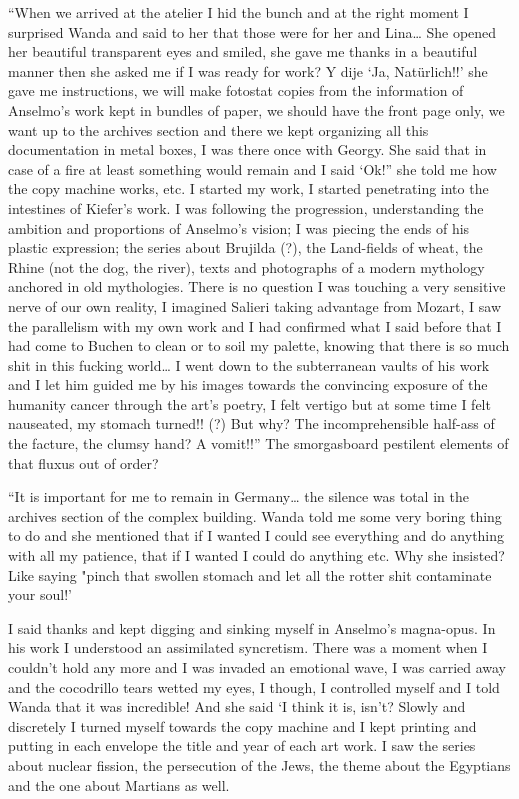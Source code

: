 \documentclass[smalldemyvopaper,11pt,twoside,onecolumn,openright,extrafontsizes]{memoir}
\begin{document}
“When we arrived at the atelier I hid the bunch and at the right moment I surprised Wanda and said to her that those were for her and Lina… She opened her beautiful transparent eyes and smiled, she gave me thanks in a beautiful manner then she asked me if I was ready for work? Y dije ‘Ja, Natürlich!!’ she gave me instructions, we will make fotostat copies from the information of Anselmo’s work kept in bundles of paper, we should have the front page only, we want up to the archives section and there we kept organizing all this documentation in metal boxes, I was there once with Georgy. She said that in case of a fire at least something would remain and I said ‘Ok!” she told me how the copy machine works, etc. I started my work, I started penetrating into the intestines of Kiefer’s work. I was following the progression, understanding the ambition and proportions of Anselmo’s vision; I was piecing the ends of his plastic expression; the series about Brujilda (?), the Land-fields of wheat, the Rhine (not the dog, the river), texts and photographs of a modern mythology anchored in old mythologies. There is no question I was touching a very sensitive nerve of our own reality, I imagined Salieri taking advantage from Mozart, I saw the parallelism with my own work and I had confirmed what I said before that I had come to Buchen to clean or to soil my palette, knowing that there is so much shit in this fucking world… I went down to the subterranean vaults of his work and I let him guided me by his images towards the convincing exposure of the humanity cancer through the art’s poetry, I felt vertigo but at some time I felt nauseated, my stomach turned!! (?) But why? The incomprehensible half-ass of the facture, the clumsy hand? A vomit!!” The smorgasboard pestilent elements of that fluxus out of order? 

“It is important for me to remain in Germany… the silence was total in the archives section of the complex building. Wanda told me some very boring thing to do and she mentioned that if I wanted I could see everything and do anything with all my patience, that if I wanted I could do anything etc. Why she insisted? Like saying "pinch that swollen stomach and let all the rotter shit contaminate your soul!'

I said thanks and kept digging and sinking myself in Anselmo’s magna-opus. In his work I understood an assimilated syncretism. There was a moment when I couldn’t hold any more and I was invaded an emotional wave, I was carried away and the cocodrillo tears wetted my eyes, I though, I controlled myself and I told Wanda that it was incredible! And she said ‘I think it is, isn’t? Slowly and discretely I turned myself towards the copy machine and I kept printing and putting in each envelope the title and year of each art work. I saw the series about nuclear fission, the persecution of the Jews, the theme about the Egyptians and the one about Martians as well.
\end{document}
